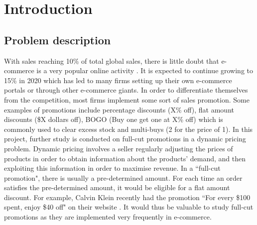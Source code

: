 \documentclass[a4paper]{article}
\begin{document}
\pagebreak
\section{Introduction}
\subsection{Problem description}
With sales reaching 10\% of total global sales, there is little doubt that e-commerce is a very popular online activity \cite{nano3}. It is expected to continue growing to 15\% in 2020 which has led to many firms setting up their own e-commerce portals or through other e-commerce giants. In order to differentiate themselves from the competition, most firms implement some sort of sales promotion. Some examples of promotions include percentage discounts (X\% off), flat amount discounts (\$X dollars off), BOGO (Buy one get one at X\% off) which is commonly used to clear excess stock and multi-buys (2 for the price of 1). In this project, further study is conducted on full-cut promotions in a dynamic pricing problem. Dynamic pricing involves a seller regularly adjusting the prices of products in order to obtain information about the products' demand, and then exploiting this information in order to maximise revenue. In a ``full-cut promotion", there is usually a pre-determined amount. For each time an order satisfies the pre-determined amount, it would be eligible for a flat amount discount. For example, Calvin Klein recently had the promotion ``For every \$100 spent, enjoy \$40 off" on their website \cite{CK}. It would thus be valuable to study full-cut promotions as they are implemented very frequently in e-commerce. 
\end{document}
